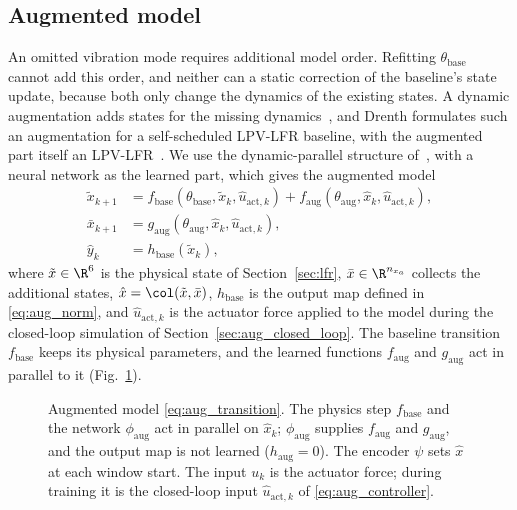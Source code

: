 \subsection{Augmented model}\label{sec:aug_structure}
An omitted vibration mode requires additional model order.
Refitting $\theta_{\mathrm{base}}$ cannot add this order, and neither can a
static correction of the baseline's state update, because both only change
the dynamics of the existing states.
A dynamic augmentation adds states for the missing
dynamics~\cite[Sec.~2]{hoekstra2025lfr}, and Drenth formulates such an
augmentation for a self-scheduled LPV-LFR baseline, with the augmented part
itself an LPV-LFR~\cite[Sec.~5.2]{drenth2025thesis}.
We use the dynamic-parallel structure of~\cite[Table~1]{hoekstra2026lfr},
with a neural network as the learned part, which gives the augmented model
\begin{equation}
\begin{aligned}
 \tilde x_{k+1}
 &=f_{\mathrm{base}}(\theta_{\mathrm{base}},\tilde x_k,\hat u_{\mathrm{act},k})
   +f_{\mathrm{aug}}(\theta_{\mathrm{aug}},\hat x_k,\hat u_{\mathrm{act},k}),\\
 \bar x_{k+1}
 &=g_{\mathrm{aug}}(\theta_{\mathrm{aug}},\hat x_k,\hat u_{\mathrm{act},k}),\\
 \hat y_k&=h_{\mathrm{base}}(\tilde x_k),
\end{aligned}
\label{eq:aug_transition}
\end{equation}
where $\tilde x\in\R^6$ is the physical state of Section~\ref{sec:lfr},
$\bar x\in\R^{n_{x_a}}$ collects the additional states,
$\hat x=\col(\tilde x,\bar x)$, $h_{\mathrm{base}}$ is the output map
defined in \eqref{eq:aug_norm}, and $\hat u_{\mathrm{act},k}$ is the actuator
force applied to the model during the closed-loop simulation of
Section~\ref{sec:aug_closed_loop}.
The baseline transition $f_{\mathrm{base}}$ keeps its physical parameters,
and the learned functions $f_{\mathrm{aug}}$ and $g_{\mathrm{aug}}$ act in
parallel to it (Fig.~\ref{fig:aug_structure}).

\begin{figure}[t]
 \centering
 \resizebox{\columnwidth}{!}{}
 \caption{Augmented model \eqref{eq:aug_transition}. The physics step
 $f_{\mathrm{base}}$ and the network $\phi_{\mathrm{aug}}$ act in parallel
 on $\hat x_k$; $\phi_{\mathrm{aug}}$ supplies $f_{\mathrm{aug}}$ and
 $g_{\mathrm{aug}}$, and the output map is not learned
 ($h_{\mathrm{aug}}=0$). The encoder $\psi$ sets $\hat x$ at each window
 start. The input $u_k$ is the actuator force; during training it is the
 closed-loop input $\hat u_{\mathrm{act},k}$ of \eqref{eq:aug_controller}.}
 \label{fig:aug_structure}
\end{figure}

